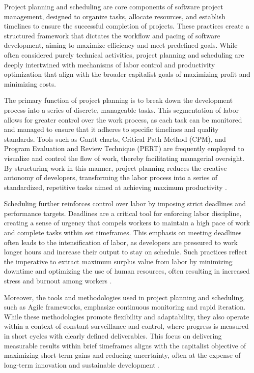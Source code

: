 \begin{refsection}
Project planning and scheduling are core components of software project management, designed to organize tasks, allocate resources, and establish timelines to ensure the successful completion of projects. These practices create a structured framework that dictates the workflow and pacing of software development, aiming to maximize efficiency and meet predefined goals. While often considered purely technical activities, project planning and scheduling are deeply intertwined with mechanisms of labor control and productivity optimization that align with the broader capitalist goals of maximizing profit and minimizing costs.

The primary function of project planning is to break down the development process into a series of discrete, manageable tasks. This segmentation of labor allows for greater control over the work process, as each task can be monitored and managed to ensure that it adheres to specific timelines and quality standards. Tools such as Gantt charts, Critical Path Method (CPM), and Program Evaluation and Review Technique (PERT) are frequently employed to visualize and control the flow of work, thereby facilitating managerial oversight. By structuring work in this manner, project planning reduces the creative autonomy of developers, transforming the labor process into a series of standardized, repetitive tasks aimed at achieving maximum productivity \cite[pp.~89-91]{Lock2007ProjectManagement}.

Scheduling further reinforces control over labor by imposing strict deadlines and performance targets. Deadlines are a critical tool for enforcing labor discipline, creating a sense of urgency that compels workers to maintain a high pace of work and complete tasks within set timeframes. This emphasis on meeting deadlines often leads to the intensification of labor, as developers are pressured to work longer hours and increase their output to stay on schedule. Such practices reflect the imperative to extract maximum surplus value from labor by minimizing downtime and optimizing the use of human resources, often resulting in increased stress and burnout among workers \cite[pp.~54-56]{Harvey2010EnigmaOfCapital}.

Moreover, the tools and methodologies used in project planning and scheduling, such as Agile frameworks, emphasize continuous monitoring and rapid iteration. While these methodologies promote flexibility and adaptability, they also operate within a context of constant surveillance and control, where progress is measured in short cycles with clearly defined deliverables. This focus on delivering measurable results within brief timeframes aligns with the capitalist objective of maximizing short-term gains and reducing uncertainty, often at the expense of long-term innovation and sustainable development \cite[pp.~87-89]{Cockburn2007AgileSoftwareDevelopment}.


\end{refsection}
